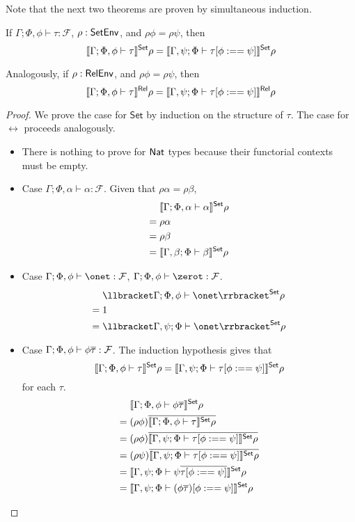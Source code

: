 \documentclass[acmsmall,review,anonymous]{acmart}
\theoremstyle{definition}
\newcommand{\F}{\mathcal{F}}
\newcommand{\set}{\mathsf{Set}}
\begin{document}
Note that the next two theorems are proven by 
simultaneous induction.
\begin{thm}\label{thm:demotion-objects}
If $\Gamma; \Phi, \phi \vdash  \tau : \F$, $\rho : \mathsf{SetEnv}$, and $\rho \phi = \rho \psi$, then
  $$\setsem{\Gamma; \Phi, \phi \vdash \tau} \rho = \setsem{\Gamma, \psi; \Phi \vdash \tau[\phi :== \psi] } \rho $$

Analogously, if $\rho :\mathsf{RelEnv}$, and $\rho \phi = \rho \psi$, then
$$\llbracket{\Gamma; \Phi, \phi \vdash \tau}\rrbracket^{\mathsf{Rel}} \rho = \llbracket{\Gamma, \psi; \Phi \vdash \tau[\phi :== \psi] }\rrbracket^{\mathsf{Rel}} \rho $$

\end{thm}
\begin{proof}
We prove the case for $\set$ by induction on the structure of $\tau$.
The case for $\rel$ proceeds analogously.
\begin{itemize}
  \item There is nothing to prove for $\mathsf{Nat}$ types because their functorial contexts must be empty.
  \item Case $\Gamma; \Phi, \alpha \vdash \alpha : \F$. Given that $\rho \alpha = \rho \beta$, 
    \begin{align*}
         & \setsem{\Gamma; \Phi, \alpha \vdash \alpha } \rho \\
    = \; & \rho \alpha \\
    = \; & \rho \beta \\
    = \; & \setsem{\Gamma, \beta; \Phi \vdash \beta } \rho
    \end{align*}

  \item Case $\Gamma; \Phi, \phi \vdash \onet :\F$,  $\Gamma; \Phi, \phi \vdash \zerot :\F$.
    \begin{align*}
         & \setsem{\Gamma; \Phi, \phi \vdash \onet } \rho \\
    = \; & 1 \\
    = \; & \setsem{\Gamma, \psi; \Phi \vdash \onet } \rho
    \end{align*}

  \item Case $\Gamma; \Phi, \phi \vdash \phi \ol\tau : \F$. The induction hypothesis gives that 
    $$\setsem{\Gamma; \Phi, \phi \vdash \tau } \rho
      = \setsem{\Gamma, \psi; \Phi \vdash \tau[\phi :== \psi] } \rho$$ 
    for each $\tau$.
    \begin{align*}
         & \setsem{\Gamma; \Phi, \phi \vdash \phi \ol\tau } \rho \\
      = \; & (\rho \phi) \ol{\setsem{\Gamma; \Phi, \phi \vdash \tau } \rho} \\
      = \; & (\rho \phi) \ol{\setsem{\Gamma, \psi; \Phi \vdash \tau[\phi :== \psi] } \rho} \\
      = \; & (\rho \psi) \ol{\setsem{\Gamma, \psi; \Phi \vdash \tau[\phi :== \psi] } \rho} \\
      = \; & \setsem{\Gamma, \psi; \Phi \vdash \psi \ol{\tau[\phi :== \psi]} } \rho \\
      = \; & \setsem{\Gamma, \psi; \Phi \vdash (\phi \ol\tau)[\phi :== \psi] } \rho
    \end{align*}
  

\end{itemize}
\end{proof}
\end{document}
